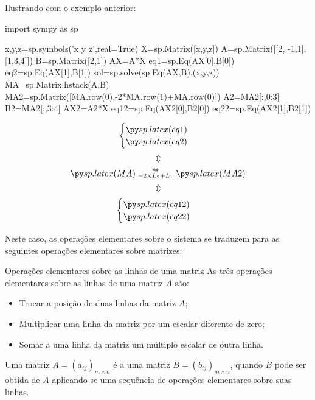 \begin{frame}[label=sistemas,fragile=singleslide]
Ilustrando com o exemplo anterior:
\begin{pycode}
import sympy as sp

x,y,z=sp.symbols('x y z',real=True)
X=sp.Matrix([x,y,z])
A=sp.Matrix([[2, -1,1],[1,3,4]])
B=sp.Matrix([2,1])
AX=A*X
eq1=sp.Eq(AX[0],B[0])
eq2=sp.Eq(AX[1],B[1])
sol=sp.solve(sp.Eq(AX,B),(x,y,z))
MA=sp.Matrix.hstack(A,B)
MA2=sp.Matrix([MA.row(0),-2*MA.row(1)+MA.row(0)])
A2=MA2[:,0:3]
B2=MA2[:,3:4]
AX2=A2*X
eq12=sp.Eq(AX2[0],B2[0])
eq22=sp.Eq(AX2[1],B2[1])
\end{pycode}


\[\begin{cases}
\pyl{eq1}\\
\pyl{eq2}
\end{cases}
\]
\[\Updownarrow \]
\[
\pyl{MA}
\stackrel{\Leftrightarrow}{_{-2\times L_2+L_1}}
\pyl{MA2}
\]
\[\Updownarrow \]
\[
\begin{cases}
\pyl{eq12}\\
\pyl{eq22}
\end{cases}
\]
\end{frame}

\begin{frame}[label=sistemas]
Neste caso, as operações elementares sobre o sistema se traduzem para as seguintes {\color{blue} operações elementares sobre matrizes}:

\begin{block}{Operações elementares sobre as linhas de uma matriz}
As três operações elementares sobre as linhas de uma matriz $A$ são:
\begin{itemize}
\item Trocar a posição de duas linhas da matriz $A$;
\item Multiplicar uma linha da matriz por um escalar diferente de zero;
\item Somar a uma linha da matriz um múltiplo escalar de outra linha.
\end{itemize}
\end{block}

\begin{defin}
Uma matriz $A=(a_{ij})_{m\times n}$ é {\color{blue}{linha-equivalente}} a uma matriz $B=(b_{ij})_{m\times n}$, quando $B$ pode ser obtida de $A$ aplicando-se uma sequência de operações elementares sobre suas linhas.
\end{defin}
\end{frame}


